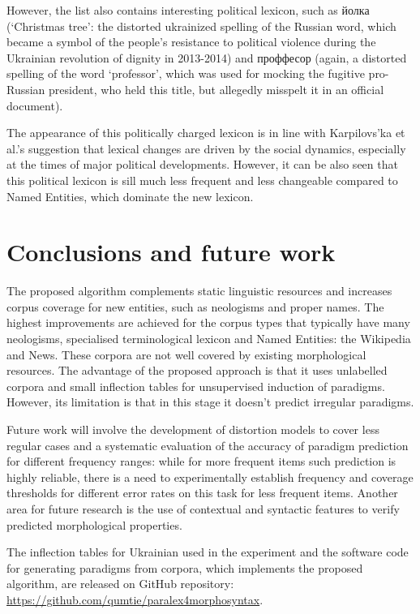\documentclass[11pt,a4paper]{article}
\begin{document}
However, the list also contains interesting political lexicon, such as йолка  (`Christmas tree': the distorted ukrainized spelling of the Russian word, which became a symbol of the people's resistance to political violence during the Ukrainian revolution of dignity in 2013-2014) and проффесор  (again, a distorted spelling of the word `professor', which was used for mocking the fugitive pro-Russian president, who held this title, but allegedly misspelt it in an official document). 

The appearance of this politically charged lexicon is in line with Karpilovs'ka et al.'s  suggestion that lexical changes are driven by the social dynamics, especially at the times of major political developments. However, it can be also seen that this political lexicon is sill much less frequent and less changeable compared to Named Entities, which dominate the new lexicon.


\section{Conclusions and future work}
\label{sec:Conclusions}


The proposed algorithm complements static linguistic resources and increases corpus coverage for new entities, such as neologisms and proper names. The highest improvements are achieved for the corpus types that typically have many neologisms, specialised terminological lexicon and Named Entities: the Wikipedia and News. These corpora are not well covered by existing morphological resources. The advantage of the proposed approach is that it uses unlabelled corpora and small inflection tables for unsupervised induction of paradigms. However, its limitation is that in this stage it doesn't predict irregular paradigms. 

Future work will involve the development of distortion models to cover less regular cases and a systematic evaluation of the accuracy of paradigm prediction for different frequency ranges: while for more frequent items such prediction is highly reliable, there is a need to experimentally establish frequency and coverage thresholds for different error rates on this task for less frequent items. Another area for future research is the use of contextual and syntactic features to verify predicted morphological properties.

The inflection tables for Ukrainian used in the experiment and the software code for generating paradigms from corpora, which implements the proposed algorithm, are released on GitHub repository: \url{https://github.com/qumtie/paralex4morphosyntax}. 



\end{document}
